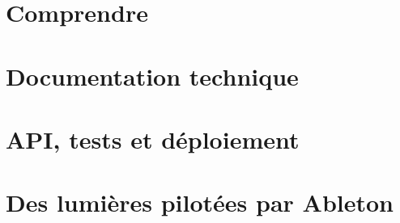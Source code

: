 \documentclass[11pt,a4paper,oneside]{report}
\begin{document}
\part{Comprendre \Icare}


\part{Documentation technique}


\part{API, tests et déploiement}


\part{Des lumières pilotées par Ableton}


\appendix

\end{document}
